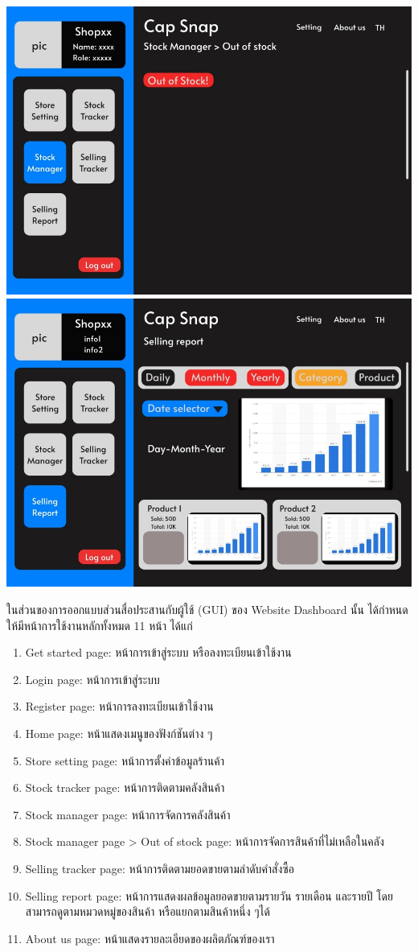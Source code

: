 {
 \includegraphics[scale=0.9]{pic/ui/11.jpg}
 \includegraphics[scale=0.9]{pic/ui/12.jpg}
}


ในส่วนของการออกแบบส่วนสื่อประสานกับผู้ใช้ (GUI) ของ Website Dashboard นั้น ได้กำหนดให้มีหน้าการใช้งานหลักทั้งหมด 11 หน้า ได้แก่
\begin{enumerate}
    \item Get started page: หน้าการเข้าสู่ระบบ หรือลงทะเบียนเข้าใช้งาน
    \item Login page: หน้าการเข้าสู่ระบบ
    \item Register page: หน้าการลงทะเบียนเข้าใช้งาน
    \item Home page:  หน้าแสดงเมนูของฟังก์ชันต่าง ๆ
    \item Store setting page: หน้าการตั้งค่าข้อมูลร้านค้า
    \item Stock tracker page: หน้าการติดตามคลังสินค้า
    \item Stock manager page: หน้าการจัดการคลังสินค้า
    \item Stock manager page > Out of stock page: หน้าการจัดการสินค้าที่ไม่เหลือในคลัง
    \item Selling tracker page: หน้าการติดตามยอดขายตามลำดับคำสั่งซื้อ
    \item Selling report page: หน้าการแสดงผลข้อมูลยอดขายตามรายวัน รายเดือน และรายปี โดยสามารถดูตามหมวดหมู่ของสินค้า หรือแยกตามสินค้าหนึ่ง ๆได้
    \item About us page: หน้าแสดงรายละเอียดของผลิตภัณฑ์ของเรา
\end{enumerate}
 
